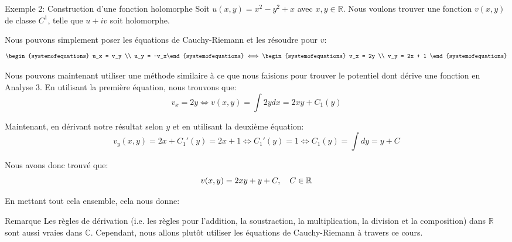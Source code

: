\documentclass[a4paper]{article}
\begin{document}
\begin{parag}{Exemple 2: Construction d'une fonction holomorphe}
    Soit $u\left(x, y\right) = x^2 - y^2 + x$ avec $x, y \in \mathbb{R}$. Nous voulons trouver une fonction $v\left(x, y\right)$ de classe $C^1$, telle que $u + iv$ soit holomorphe.

    Nous pouvons simplement poser les équations de Cauchy-Riemann et les résoudre pour $v$: 
    \[\begin{systemofequations} u_x = v_y \\ u_y = -v_x\end{systemofequations} \iff \begin{systemofequations} v_x = 2y \\ v_y = 2x + 1 \end{systemofequations}\]
    
    Nous pouvons maintenant utiliser une méthode similaire à ce que nous faisions pour trouver le potentiel dont dérive une fonction en Analyse 3. En utilisant la première équation, nous trouvons que: 
    \[v_x = 2y \iff v\left(x, y\right) = \int2y dx = 2xy + C_1\left(y\right)\]
    
    Maintenant, en dérivant notre résultat selon $y$ et en utilisant la deuxième équation: 
    \[v_y\left(x, y\right) = 2x + C_1'\left(y\right) = 2x + 1 \iff C_1'\left(y\right) = 1 \iff C_1\left(y\right) = \int dy = y + C\]
    
    Nous avons donc trouvé que: 
    \[v\left(x, y\right) = 2xy + y + C, \mathspace C \in \mathbb{R}\]

    En mettant tout cela ensemble, cela nous donne: 
\end{parag}

\begin{parag}{Remarque}
    Les règles de dérivation (i.e. les règles pour l'addition, la soustraction, la multiplication, la division et la composition) dans $\mathbb{R}$ sont aussi vraies dans $\mathbb{C}$. Cependant, nous allons plutôt utiliser les équations de Cauchy-Riemann à travers ce cours.
\end{parag}
\end{document}
